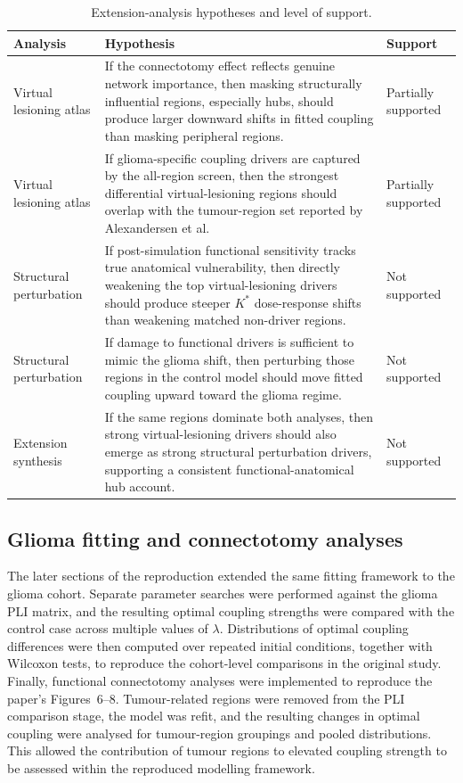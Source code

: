 \documentclass[11pt, reprint, aps, prl, floatfix, secnumarabic]{revtex4-2}
\begin{document}
\begin{table}[t]
\centering
\small
\caption{Extension-analysis hypotheses and level of support.}
\setlength{\tabcolsep}{8pt}
\renewcommand{\arraystretch}{1.4}
\begin{tabular}{@{}p{}p{}p{}@{}}
\toprule
\textbf{Analysis} & \textbf{Hypothesis} & \textbf{Support} \\
\midrule
Virtual lesioning atlas & If the connectotomy effect reflects genuine network importance, then masking structurally influential regions, especially hubs, should produce larger downward shifts in fitted coupling than masking peripheral regions. & Partially supported \\[2pt]
Virtual lesioning atlas & If glioma-specific coupling drivers are captured by the all-region screen, then the strongest differential virtual-lesioning regions should overlap with the tumour-region set reported by Alexandersen et al. & Partially supported \\[2pt]
Structural perturbation & If post-simulation functional sensitivity tracks true anatomical vulnerability, then directly weakening the top virtual-lesioning drivers should produce steeper $K^*$ dose-response shifts than weakening matched non-driver regions. & Not supported \\[2pt]
Structural perturbation & If damage to functional drivers is sufficient to mimic the glioma shift, then perturbing those regions in the control model should move fitted coupling upward toward the glioma regime. & Not supported \\[2pt]
Extension synthesis & If the same regions dominate both analyses, then strong virtual-lesioning drivers should also emerge as strong structural perturbation drivers, supporting a consistent functional-anatomical hub account. & Not supported \\
\bottomrule
\end{tabular}
\renewcommand{\arraystretch}{1}
\setlength{\tabcolsep}{6pt}
\label{tab:hypotheses_overview}
\end{table}

\subsection{Glioma fitting and connectotomy analyses}
The later sections of the reproduction extended the same fitting framework to the glioma cohort. Separate parameter searches were performed against the glioma PLI matrix, and the resulting optimal coupling strengths were compared with the control case across multiple values of $\lambda$. Distributions of optimal coupling differences were then computed over repeated initial conditions, together with Wilcoxon tests, to reproduce the cohort-level comparisons in the original study. 
Finally, functional connectotomy analyses were implemented to reproduce the paper's Figures~6--8. Tumour-related regions were removed from the PLI comparison stage, the model was refit, and the resulting changes in optimal coupling were analysed for tumour-region groupings and pooled distributions. This allowed the contribution of tumour regions to elevated coupling strength to be assessed within the reproduced modelling framework.
\end{document}
